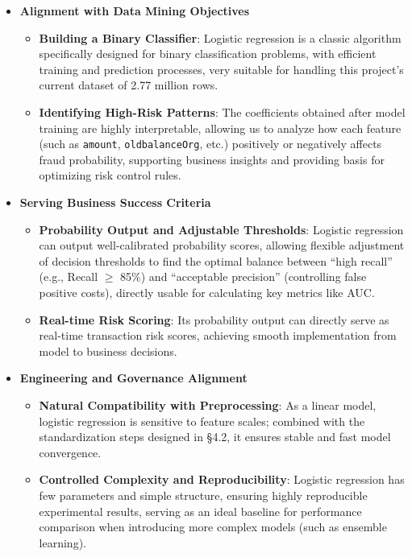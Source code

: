 \documentclass[sigplan,screen]{acmart}
\begin{document}
\begin{itemize}
    \item \textbf{Alignment with Data Mining Objectives}
    \begin{itemize}
        \item \textbf{Building a Binary Classifier}: Logistic regression is a classic algorithm specifically designed for binary classification problems, with efficient training and prediction processes, very suitable for handling this project's current dataset of 2.77 million rows.
        \item \textbf{Identifying High-Risk Patterns}: The coefficients obtained after model training are highly interpretable, allowing us to analyze how each feature (such as \texttt{amount}, \texttt{oldbalanceOrg}, etc.) positively or negatively affects fraud probability, supporting business insights and providing basis for optimizing risk control rules.
\end{itemize}
    \item \textbf{Serving Business Success Criteria}
\begin{itemize}
        \item \textbf{Probability Output and Adjustable Thresholds}: Logistic regression can output well-calibrated probability scores, allowing flexible adjustment of decision thresholds to find the optimal balance between ``high recall'' (e.g., Recall $\geq$ 85\%) and ``acceptable precision'' (controlling false positive costs), directly usable for calculating key metrics like AUC.
        \item \textbf{Real-time Risk Scoring}: Its probability output can directly serve as real-time transaction risk scores, achieving smooth implementation from model to business decisions.
\end{itemize}
    \item \textbf{Engineering and Governance Alignment}
\begin{itemize}
        \item \textbf{Natural Compatibility with Preprocessing}: As a linear model, logistic regression is sensitive to feature scales; combined with the standardization steps designed in \S4.2, it ensures stable and fast model convergence.
        \item \textbf{Controlled Complexity and Reproducibility}: Logistic regression has few parameters and simple structure, ensuring highly reproducible experimental results, serving as an ideal baseline for performance comparison when introducing more complex models (such as ensemble learning).
    \end{itemize}
\end{itemize}
\end{document}
